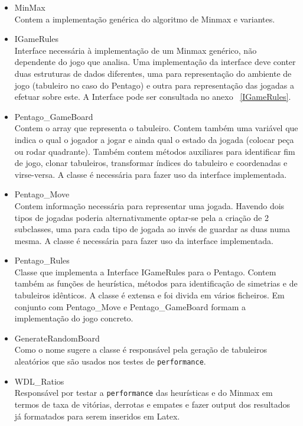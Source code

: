 \begin{itemize}  

\item MinMax \\
Contem a implementação genérica do algoritmo de Minmax e variantes.

\item IGameRules \\
Interface necessária à implementação de um Minmax genérico, não dependente do jogo que analisa. Uma implementação da interface deve conter duas estruturas de dados diferentes, uma para representação do ambiente de jogo (tabuleiro no caso do Pentago) e outra para representação das jogadas a efetuar sobre este. A Interface pode ser consultada no anexo ~\ref{IGameRules}.

\item Pentago\_GameBoard \\
Contem o array que representa o tabuleiro. Contem também uma variável que indica o qual o jogador a jogar e ainda qual o estado da jogada (colocar peça ou rodar quadrante). Também contem métodos auxiliares para identificar fim de jogo, clonar tabuleiros, transformar índices do tabuleiro e coordenadas e virse-versa. A classe é necessária para fazer uso da interface implementada.

\item Pentago\_Move \\
Contem informação necessária para representar uma jogada. Havendo dois tipos de jogadas poderia alternativamente optar-se pela a criação de 2 subclasses, uma para cada tipo de jogada ao invés de guardar as duas numa mesma. A classe é necessária para fazer uso da interface implementada.

\item Pentago\_Rules \\
Classe que implementa a Interface IGameRules para o Pentago. Contem também as funções de heurística, métodos para identificação de simetrias e de tabuleiros idênticos. A classe é extensa e foi divida em vários ficheiros. Em conjunto com Pentago\_Move e Pentago\_GameBoard formam a implementação do jogo concreto.

\item GenerateRandomBoard \\
Como o nome sugere a classe é responsável pela geração de tabuleiros aleatórios que são usados nos testes de \verb|performance|. 

\item WDL\_Ratios \\
Responsável por testar a \verb|performance| das heurísticas e do Minmax em termos de taxa de vitórias, derrotas e empates e fazer output dos resultados já formatados para serem inseridos em Latex.


\end{itemize}
